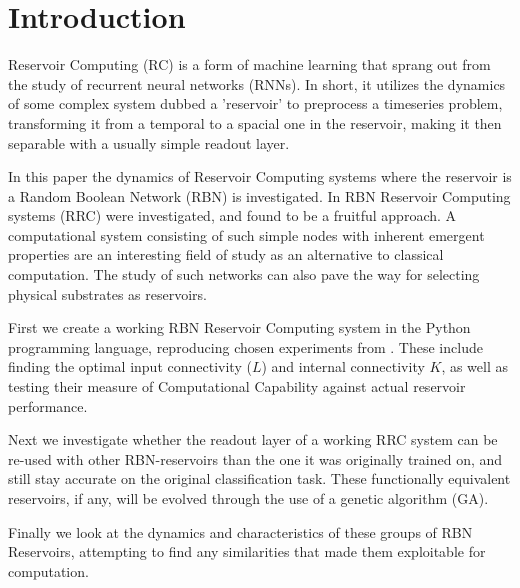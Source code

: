 \section{Introduction}

Reservoir Computing (RC) is a form of machine learning that sprang out from the study of recurrent neural networks (RNNs).
In short, it utilizes the dynamics of some complex system dubbed a 'reservoir' to preprocess a timeseries problem,
transforming it from a temporal to a spacial one in the reservoir, making it then separable with a usually simple readout layer.

In this paper the dynamics of Reservoir Computing systems where the reservoir is a Random Boolean Network (RBN) \cite{gershenson2004introduction} is investigated.
In \cite{rbn-reservoir} RBN Reservoir Computing systems (RRC) were investigated,
and found to be a fruitful approach.
A computational system consisting of such simple nodes with inherent emergent properties
are an interesting field of study as an alternative to classical computation.
The study of such networks can also pave the way for selecting physical substrates as reservoirs.

First we create a working RBN Reservoir Computing system in the Python programming language,
reproducing chosen experiments from \cite{rbn-reservoir}.
These include finding the optimal input connectivity ($L$) and internal connectivity $K$,
as well as testing their measure of Computational Capability against actual reservoir performance.

Next we investigate whether the readout layer of a working RRC system can be re-used with other RBN-reservoirs than the one it was originally trained on,
and still stay accurate on the original classification task.
These functionally equivalent reservoirs, if any, will be evolved through the use of a genetic algorithm (GA).

Finally we look at the dynamics and characteristics of these groups of RBN Reservoirs,
attempting to find any similarities that made them exploitable for computation.
